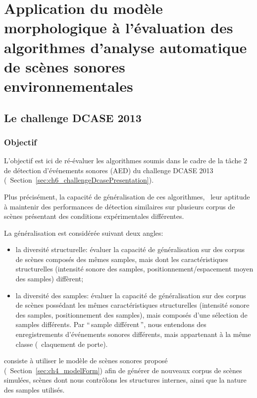 \chapter[Application du modèle à l'évaluation]{Application du modèle morphologique à l'évaluation des algorithmes d'analyse automatique de scènes sonores environnementales}\label{ch:ml_simuperf}

\section{Le challenge DCASE  2013}

\subsection{Objectif}

L'objectif est ici de ré-évaluer les algorithmes soumis dans le cadre de la tâche 2 de détection d'événements sonores (AED) du challenge DCASE 2013 (\cf~Section~\ref{sec:ch6_challengeDcasePresentation}). 

Plus précisément,   la capacité de généralisation de ces algorithmes, \ie~leur aptitude à maintenir des performances de détection similaires sur plusieurs corpus de scènes présentant des conditions expérimentales différentes.

La généralisation est considérée suivant deux angles:

\begin{itemize}
\item la diversité structurelle: évaluer la capacité de généralisation sur des corpus de scènes composés des mêmes samples, mais dont les caractéristiques structurelles (intensité sonore des samples, positionnement/espacement moyen des samples) diffèrent;
\item la diversité des samples: évaluer la capacité de généralisation sur des corpus de scènes possédant les mêmes caractéristiques structurelles (intensité sonore des samples, positionnement des samples), mais composés d'une sélection de samples différents. Par ``\,sample différent\,'', nous entendons des enregistrements d'événements sonores différents, mais appartenant à la même classe (\eg~claquement de porte). 
\end{itemize}

  consiste à utiliser le modèle de scènes sonores proposé (\cf~Section~\ref{sec:ch4_modelForm}) afin de générer de nouveaux corpus de scènes simulées, scènes dont nous contrôlons les structures internes, ainsi que la nature des samples utilisés. 

